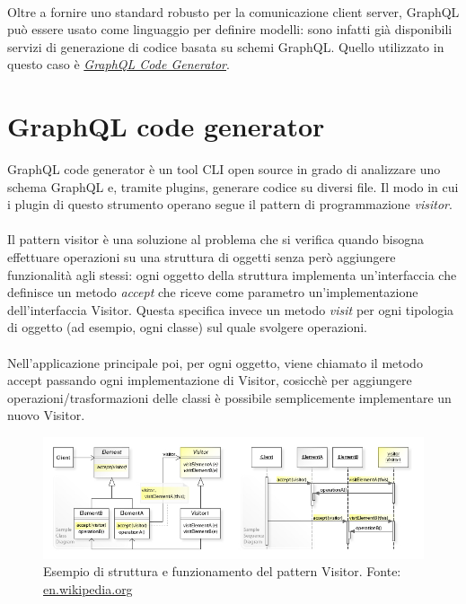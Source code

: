 \documentclass[a4paper, 12pt]{report}
\begin{document}
      \paragraph*{}
        Oltre a fornire uno standard robusto per la comunicazione client server, GraphQL può essere usato come linguaggio per definire modelli: sono infatti già disponibili servizi di generazione di codice basata su schemi GraphQL.
        Quello utilizzato in questo caso è \href{https://graphql-code-generator.com/}{\emph{GraphQL Code Generator}}.
      \newpage
    \section{GraphQL code generator}
        GraphQL code generator è un tool CLI open source in grado di analizzare uno schema GraphQL e, tramite plugins, generare codice su diversi file.
        Il modo in cui i plugin di questo strumento operano segue il pattern di programmazione \emph{visitor}.
      \paragraph*{}
        Il pattern visitor è una soluzione al problema che si verifica quando bisogna effettuare operazioni su una struttura di oggetti senza però aggiungere funzionalità agli stessi:
        ogni oggetto della struttura implementa un'interfaccia che definisce un metodo \emph{accept} che riceve come parametro un'implementazione dell'interfaccia Visitor.
        Questa specifica invece un metodo \emph{visit} per ogni tipologia di oggetto (ad esempio, ogni classe) sul quale svolgere operazioni.
      \paragraph*{}
        Nell'applicazione principale poi, per ogni oggetto, viene chiamato il metodo accept passando ogni implementazione di Visitor, cosicchè per aggiungere operazioni/trasformazioni delle classi è possibile semplicemente implementare un nuovo Visitor.
      \begin{figure}[H]
          \includegraphics[width=\textwidth]{visitor-example.jpg}
          \caption{Esempio di struttura e funzionamento del pattern Visitor. Fonte: \href{https://en.wikipedia.org/wiki/Visitor_pattern}{en.wikipedia.org}}
      \end{figure}
\end{document}
